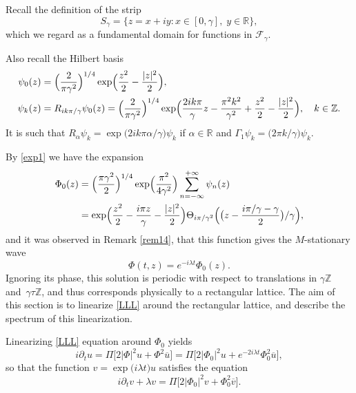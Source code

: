 \documentclass[10pt]{amsart}
\let\sep:
\theoremstyle{definition}
\let\EE\exp
\let\ov\overline
\newcommand\R{\mathbb R}
\newcommand{\bpac}[1]{\bigl[#1\bigr]}
\begin{document}
Recall the definition of the strip
\[
S_{\gamma}=\bigl\{z=x+iy\sep x\in[0,\gamma],\; y\in \R\bigr\},
\]
which we regard as a fundamental domain for functions in $\mathcal{F}_\gamma$.

Also recall the Hilbert basis
\begin{align*}
\psi_0(z)&=\Bigl(\frac{2}{\pi \gamma^2}\Bigr)^{1/4}\EE\Bigl(\frac{z^2}2-\frac{|z|^2}2\Bigr),\\
\psi_k(z)&=R_{{ik\pi}/{\gamma}}\psi_0(z)=\Bigl(\frac{2}{\pi \gamma^2}\Bigr)^{1/4}\EE\Bigl(\frac{2ik\pi} {\gamma} z -\frac{\pi^2k^2}{\gamma^2}+\frac{z^2}{2}-\frac{|z|^2}2\Bigr), \quad k \in \mathbb{Z}.
\end{align*}
It is such that $R_{\alpha}\psi_k=\EE\bigl({{2ik\pi \alpha}/ {\gamma}}\bigr) \psi_k$ if $\alpha \in \mathbb{R}$ and $\Gamma_1 \psi_k=\bigl({2 \pi k}/{\gamma} \bigr)\psi_k$.

By \eqref{exp1} we have the expansion
\begin{align*}
\Phi_0(z)&= \Bigl(\frac{\pi \gamma^2}{2}\Bigr)^{1/4} \EE\Bigl(\frac {\pi^2}{4\gamma^2}\Bigr) \sum_{n=-\infty}^{+\infty} \psi_n (z)\\
&=\EE\Bigl(\frac{z^2}2 -\frac{i\pi z} {\gamma} - \frac{|z|^2}2\Bigr) \Theta_{{i\pi}/{\gamma^2}}\Bigl({ \bigl({z-\frac{{i\pi}/{\gamma}-\gamma}2}}\bigr)/\gamma\Bigr),
\end{align*}
and it was observed in Remark \ref{rem14}, that this function gives the $M$-stationary wave
\[
\Phi(t,z) = e^{-i\lambda t}\Phi_0(z).
\]
Ignoring its phase, this solution is periodic with respect to translations in $\gamma \mathbb{Z}$ and~$\gamma \tau \mathbb{Z}$, and thus corresponds physically to a rectangular lattice.
The aim of this section is to linearize \eqref{LLL} around the rectangular lattice, and describe the spectrum of this linearization.

Linearizing \eqref{LLL} equation around $\Phi_0$ yields
\begin{equation}
i\partial_t u = \Pi\big[2|\Phi|^2u+\Phi^2\ov{u}\big] = \Pi\bpac{2|\Phi_0|^2u+e^{-2i\lambda t}\Phi_0^2\ov{u}},
\end{equation}
so that the function $v = \EE\bigl({i\lambda t}\bigr)u$ satisfies the equation
\begin{equation}\label{Lin_LLL}
i\partial_t v + \lambda v = \Pi\bpac{2|\Phi_0|^2v+\Phi_0^2\ov{v}}.
\end{equation}
\end{document}
